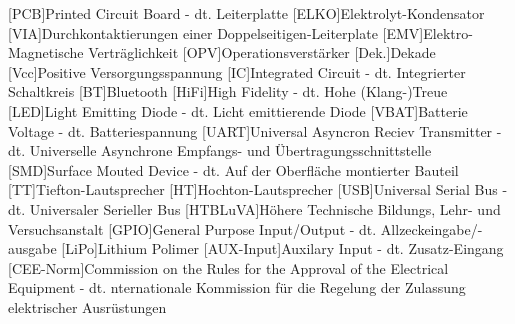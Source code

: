 
\begin{acronym}[ACRONYM]
[PCB]{Printed Circuit Board - dt. Leiterplatte}
[ELKO]{Elektrolyt-Kondensator}
[VIA]{Durchkontaktierungen einer Doppelseitigen-Leiterplate}
[EMV]{Elektro-Magnetische Verträglichkeit}
[OPV]{Operationsverstärker}
[Dek.]{Dekade}
[Vcc]{Positive Versorgungsspannung}
[IC]{Integrated Circuit - dt. Integrierter Schaltkreis}
[BT]{Bluetooth}
[HiFi]{High Fidelity - dt. Hohe (Klang-)Treue}
[LED]{Light Emitting Diode - dt. Licht emittierende Diode}
[VBAT]{Batterie Voltage - dt. Batteriespannung}
[UART]{Universal Asyncron Reciev Transmitter - dt. Universelle Asynchrone Empfangs- und Übertragungsschnittstelle}
[SMD]{Surface Mouted Device - dt. Auf der Oberfläche montierter Bauteil}
[TT]{Tiefton-Lautsprecher}
[HT]{Hochton-Lautsprecher}
[USB]{Universal Serial Bus - dt. Universaler Serieller Bus}
[HTBLuVA]{Höhere Technische Bildungs, Lehr- und Versuchsanstalt}
[GPIO]{General Purpose Input/Output - dt. Allzeckeingabe/-ausgabe}
[LiPo]{Lithium Polimer}
[AUX-Input]{Auxilary Input - dt. Zusatz-Eingang}
[CEE-Norm]{Commission on the Rules for the Approval of the Electrical Equipment - dt. nternationale Kommission für die Regelung der Zulassung elektrischer Ausrüstungen}



\end{acronym}\newpage

